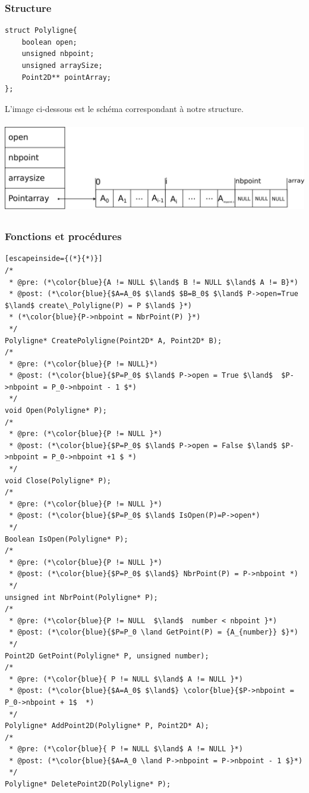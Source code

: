 \documentclass[a4paper, 11pt, oneside]{article}
\begin{document}
\subsubsection{Structure}

\begin{lstlisting}
struct Polyligne{
	boolean open;
	unsigned nbpoint;
	unsigned arraySize;
	Point2D** pointArray;
};
\end{lstlisting}

L'image ci-dessous est le schéma correspondant à notre structure.

\includegraphics[height=4cm, width=14cm]{tab1.png}

\subsubsection{Fonctions et procédures}

\begin{lstlisting}[escapeinside={(*}{*)}]
/* 
 * @pre: (*\color{blue}{A != NULL $\land$ B != NULL $\land$ A != B}*)
 * @post: (*\color{blue}{$A=A_0$ $\land$ $B=B_0$ $\land$ P->open=True $\land$ create\_Polyligne(P) = P $\land$ }*)
 * (*\color{blue}{P->nbpoint = NbrPoint(P) }*)
 */
Polyligne* CreatePolyligne(Point2D* A, Point2D* B);
/* 
 * @pre: (*\color{blue}{P != NULL}*)
 * @post: (*\color{blue}{$P=P_0$ $\land$ P->open = True $\land$  $P->nbpoint = P_0->nbpoint - 1 $*)
 */
void Open(Polyligne* P);
/* 
 * @pre: (*\color{blue}{P != NULL }*)
 * @post: (*\color{blue}{$P=P_0$ $\land$ P->open = False $\land$ $P->nbpoint = P_0->nbpoint +1 $ *)
 */
void Close(Polyligne* P);
/* 
 * @pre: (*\color{blue}{P != NULL }*)
 * @post: (*\color{blue}{$P=P_0$ $\land$ IsOpen(P)=P->open*)
 */
Boolean IsOpen(Polyligne* P);
/* 
 * @pre: (*\color{blue}{P != NULL }*)
 * @post: (*\color{blue}{$P=P_0$ $\land$} NbrPoint(P) = P->nbpoint *)
 */
unsigned int NbrPoint(Polyligne* P);
/* 
 * @pre: (*\color{blue}{P != NULL  $\land$  number < nbpoint }*)
 * @post: (*\color{blue}{$P=P_0 \land GetPoint(P) = {A_{number}} $}*)
 */
Point2D GetPoint(Polyligne* P, unsigned number);
/*
 * @pre: (*\color{blue}{ P != NULL $\land$ A != NULL }*)
 * @post: (*\color{blue}{$A=A_0$ $\land$} \color{blue}{$P->nbpoint = P_0->nbpoint + 1$  *)
 */
Polyligne* AddPoint2D(Polyligne* P, Point2D* A);
/*
 * @pre: (*\color{blue}{ P != NULL $\land$ A != NULL }*)
 * @post: (*\color{blue}{$A=A_0 \land P->nbpoint = P->nbpoint - 1 $}*)
 */
Polyligne* DeletePoint2D(Polyligne* P);
\end{lstlisting}
\end{document}
